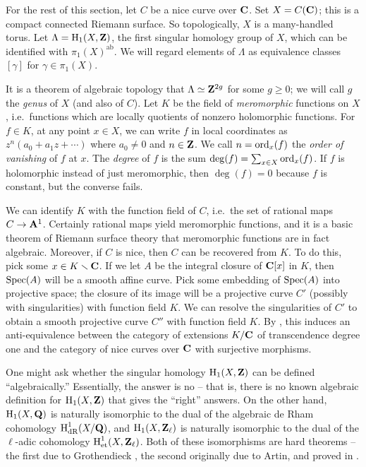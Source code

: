 For the rest of this section, let $C$ be a nice curve over $\mathbf{C}$. Set 
$X=C(\mathbf{C})$; this is a compact connected Riemann surface. So 
topologically, $X$ is a many-handled torus. Let $\Lambda=\operatorname{H}_1(X,\mathbf{Z})$, 
the first singular homology group of $X$, which can be identified with 
$\pi_1(X)^\text{ab}$. We will regard elements of $\Lambda$ as equivalence 
classes $[\gamma]$ for $\gamma\in \pi_1(X)$. 


It is a theorem of algebraic topology that $\Lambda\simeq\mathbf{Z}^{2 g}$ for some 
$g\geqslant 0$; we 
will call $g$ the \emph{genus} of $X$ (and also of $C$). Let $K$ be the field 
of \emph{meromorphic} functions on $X$, i.e.~functions which are locally quotients 
of nonzero holomorphic functions. For $f\in K$, at any point 
$x\in X$, we can write $f$ in local coordinates as $z^n(a_0+a_1 z+\cdots)$ 
where $a_0\ne 0$ and $n\in\mathbf{Z}$. We call $n=\operatorname{ord}_x(f)$ the \emph{order 
of vanishing} of $f$ at $x$. The \emph{degree} of $f$ is the sum 
$\deg(f)=\sum_{x\in X}\operatorname{ord}_x(f)$. If $f$ is holomorphic instead of just 
meromorphic, then $\deg(f)=0$ because $f$ is constant, but the converse fails. 
 
We can identify $K$ with the function field of $C$, i.e.\ the set of rational 
maps $C\to\mathbf{A}^1$. Certainly rational maps yield meromorphic functions, 
and it is a basic theorem of Riemann surface theory that meromorphic functions 
are in fact algebraic. Moreover, if $C$ is nice, then $C$ can be recovered 
from $K$. To do this, pick some $x\in K\smallsetminus \mathbf{C}$. If we let $A$ be 
the integral closure of $\mathbf{C}[x]$ in $K$, then $\operatorname{Spec}(A)$ will be a 
smooth affine curve. Pick some embedding of $\operatorname{Spec}(A)$ into projective space; 
the closure of its image will be a projective curve $C'$ (possibly with 
singularities) with function field $K$. We can resolve the singularities of 
$C'$ to obtain a smooth projective curve $C''$ with function field $K$. By 
\cite[I.6.12]{ha77}, this induces an anti-equivalence between the category of 
extensions $K/\mathbf{C}$ of transcendence degree one and the category of nice 
curves over $\mathbf{C}$ with surjective morphisms. 

One might ask whether the singular homology $\operatorname{H}_1(X,\mathbf{Z})$ can be 
defined ``algebraically.'' Essentially, the answer is no -- that is, there is 
no known algebraic definition for $\operatorname{H}_1(X,\mathbf{Z})$ that gives the 
``right'' answers. On the other hand, $\operatorname{H}_1(X,\mathbf{Q})$ is naturally 
isomorphic to the dual of the algebraic de Rham cohomology 
$\operatorname{H}_\text{dR}^1(X/\mathbf{Q})$, and $\operatorname{H}_1(X,\mathbf{Z}_\ell)$ is naturally 
isomorphic to the dual of the $\ell$-adic cohomology 
$\operatorname{H}_\text{et}^1(X,\mathbf{Z}_\ell)$. Both of these isomorphisms are hard 
theorems -- the first due to Grothendieck \cite{gr66}, the 
second originally due to Artin, and proved in \cite[I 4.6.3]{de77}. 

